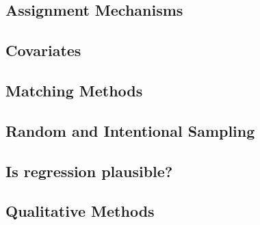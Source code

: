 \documentclass[12pt]{article}
\begin{document}
\subsection{Assignment Mechanisms}

\subsection{Covariates}

\subsection{Matching Methods}

\subsection{Random and Intentional Sampling}

\subsection{Is regression plausible?}

\subsection{Qualitative Methods}
\end{document}
